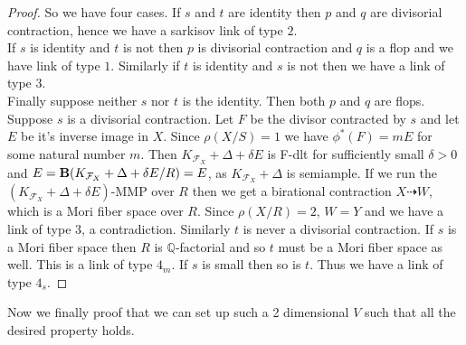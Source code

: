 \documentclass[12pt]{amsart}%
\theoremstyle{plain}
\theoremstyle{remark}
\theoremstyle{definition}
\newcommand{\<}{\leq}
\newcommand{\mbQ}{\mathbb{Q}}
\theoremstyle{definition}
\theoremstyle{definition}
\numberwithin{equation}{section}
\theoremstyle{remark}
\begin{document}
\begin{proof}
    So we have four cases. If $s$ and $t$ are identity then $p$ and $q$ are divisorial contraction, hence we have a sarkisov link of type $2$.\\
    If $s$ is identity and $t$ is not then $p$ is divisorial contraction and $q$ is a flop and we have link of type $1$. Similarly if $t$ is identity and $s$ is not then we have a link of type $3$.\\
    Finally suppose neither $s$ nor $t$ is the identity. Then both $p$ and $q$ are flops. Suppose $s$ is a divisorial contraction. Let $F$ be the divisor contracted by $s$ and let $E$ be it's inverse image in $X$. Since $\rho(X/S)=1$ we have $\phi^*(F)=mE$ for some natural number $m$. Then $K_{\mathcal{F}_X}+\Delta+\delta E$ is F-dlt for sufficiently small $\delta>0$ and $E= \bold{B}(K_{\mathcal{F}_X}+\Delta+\delta E/R)=E$, as $K_{\mathcal{F}_X}+\Delta$ is semiample. If we run the $(K_{\mathcal{F}_X}+\Delta+\delta E)$-MMP over $R$ then we get a birational contraction $X\dashrightarrow W$, which is a Mori fiber space over $R$. Since $\rho(X/R)=2$, $W=Y$ and we have a link of type $3$, a contradiction. Similarly  $t$ is never a divisorial contraction. If $s$ is a Mori fiber space then $R$ is $\mbQ$-factorial and so $t$ must be a Mori fiber space as well. This is a link of type $4_m$. If $s$ is small then so is $t$. Thus we have a link of type $4_s$.
    
\end{proof}
Now we finally proof that we can set up such a 2 dimensional $V$ such that all the desired property holds.
\end{document}
